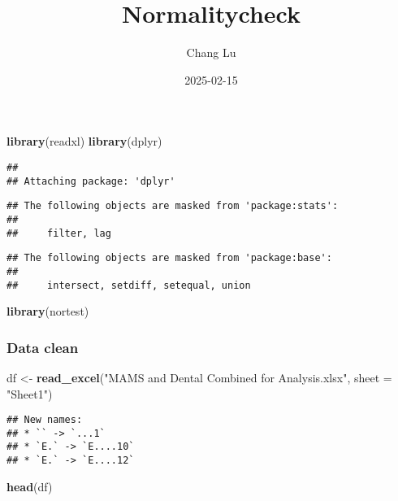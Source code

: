 \documentclass[
]{article}
\title{Normalitycheck}
\author{Chang Lu}
\date{2025-02-15}
\newenvironment{Shaded}{\begin{snugshade}}{\end{snugshade}}
\newcommand{\AttributeTok}[1]{\textcolor[rgb]{0.13,0.29,0.53}{#1}}
\newcommand{\FunctionTok}[1]{\textcolor[rgb]{0.13,0.29,0.53}{\textbf{#1}}}
\newcommand{\NormalTok}[1]{#1}
\newcommand{\OtherTok}[1]{\textcolor[rgb]{0.56,0.35,0.01}{#1}}
\newcommand{\StringTok}[1]{\textcolor[rgb]{0.31,0.60,0.02}{#1}}
\begin{document}
\maketitle

\begin{Shaded}
\begin{Highlighting}[]
\FunctionTok{library}\NormalTok{(readxl)}
\FunctionTok{library}\NormalTok{(dplyr)}
\end{Highlighting}
\end{Shaded}

\begin{verbatim}
## 
## Attaching package: 'dplyr'
\end{verbatim}

\begin{verbatim}
## The following objects are masked from 'package:stats':
## 
##     filter, lag
\end{verbatim}

\begin{verbatim}
## The following objects are masked from 'package:base':
## 
##     intersect, setdiff, setequal, union
\end{verbatim}

\begin{Shaded}
\begin{Highlighting}[]
\FunctionTok{library}\NormalTok{(nortest)}
\end{Highlighting}
\end{Shaded}

\subsubsection{Data clean}\label{data-clean}

\begin{Shaded}
\begin{Highlighting}[]
\NormalTok{df }\OtherTok{\textless{}{-}} \FunctionTok{read\_excel}\NormalTok{(}\StringTok{"MAMS and Dental Combined for Analysis.xlsx"}\NormalTok{, }\AttributeTok{sheet =} \StringTok{"Sheet1"}\NormalTok{)}
\end{Highlighting}
\end{Shaded}

\begin{verbatim}
## New names:
## * `` -> `...1`
## * `E.` -> `E....10`
## * `E.` -> `E....12`
\end{verbatim}

\begin{Shaded}
\begin{Highlighting}[]
\FunctionTok{head}\NormalTok{(df)}
\end{Highlighting}
\end{Shaded}
\end{document}
